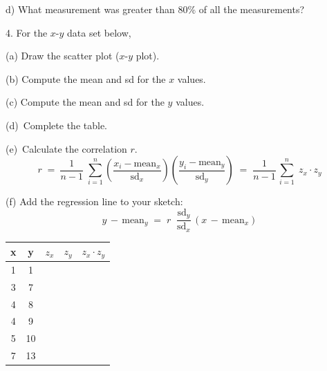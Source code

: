 \documentclass[10pt]{article}
\begin{document}
\hspace{10pt} d) What measurement was greater than 80\% of all the measurements?

\vfill
\eject

4. For the $x$-$y$ data set below,

(a) Draw the scatter plot ($x$-$y$ plot).

(b) Compute the mean and sd for the $x$ values.

(c) Compute the mean and sd for the $y$ values.

(d)~Complete the table.

(e)~Calculate the correlation $r$.\vspace{-5pt}
\[r\; =\ \frac{1}{n-1}\;\sum_{i=1}^n\left(\frac{x_i - \mbox{mean}_x}{\mbox{sd}_x}\right)
   \left(\frac{y_i - \mbox{mean}_y}{\mbox{sd}_y}\right)\;
  = \;\frac{1}{n-1}\,\sum_{i=1}^n\; z_x\cdot z_y\]

(f) Add the regression line to your sketch:\vspace{-10pt}
  \[y\,-\,\mbox{mean}_y \; = \; r\;\;\frac{\mbox{sd}_y}{\mbox{sd}_x}\,
   \left(x\, -\, \mbox{mean}_x\right)\]

\begin{center}
{\setlength{\tabcolsep}{40pt}\begin{tabular}{|c|c||c|c|c|}\hline
x & y & $z_x$ & $z_y$ & $z_x\cdot z_y$\vphantom{\LARGE Y}\\ \hline
1 & 1\vphantom{\LARGE Y} &&&\\[20pt]
3 & 7 &&&\\[20pt]
4 & 8 &&&\\[20pt]
4 & 9 &&&\\[20pt]
5 & 10 &&&\\[20pt]
7 & 13 &&&\\[20pt]\hline
\end{tabular}}
\end{center}

\vfill
\eject
\end{document}
